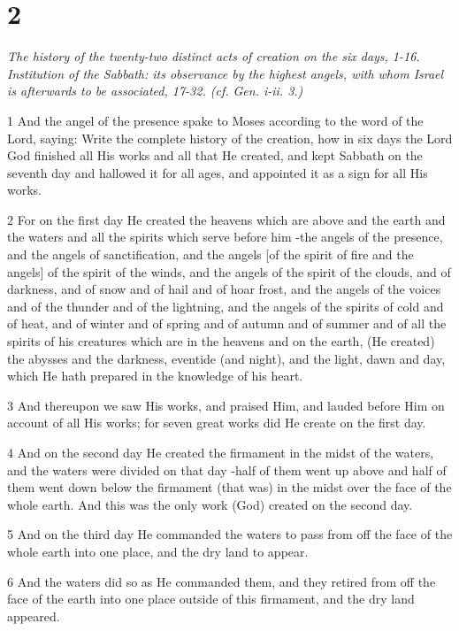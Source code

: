 \chapter{2}

\par \textit{The history of the twenty-two distinct acts of creation on the six days, 1-16. Institution of the Sabbath: its observance by the highest angels, with whom Israel is afterwards to be associated, 17-32. (cf. Gen. i-ii. 3.)}

\par 1 And the angel of the presence spake to Moses according to the word of the Lord, saying: Write the complete history of the creation, how in six days the Lord God finished all His works and all that He created, and kept Sabbath on the seventh day and hallowed it for all ages, and appointed it as a sign for all His works.
\par 2 For on the first day He created the heavens which are above and the earth and the waters and all the spirits which serve before him -the angels of the presence, and the angels of sanctification, and the angels [of the spirit of fire and the angels] of the spirit of the winds, and the angels of the spirit of the clouds, and of darkness, and of snow and of hail and of hoar frost, and the angels of the voices and of the thunder and of the lightning, and the angels of the spirits of cold and of heat, and of winter and of spring and of autumn and of summer and of all the spirits of his creatures which are in the heavens and on the earth, (He created) the abysses and the darkness, eventide (and night), and the light, dawn and day, which He hath prepared in the knowledge of his heart.
\par 3 And thereupon we saw His works, and praised Him, and lauded before Him on account of all His works; for seven great works did He create on the first day.
\par 4 And on the second day He created the firmament in the midst of the waters, and the waters were divided on that day -half of them went up above and half of them went down below the firmament (that was) in the midst over the face of the whole earth. And this was the only work (God) created on the second day.
\par 5 And on the third day He commanded the waters to pass from off the face of the whole earth into one place, and the dry land to appear.
\par 6 And the waters did so as He commanded them, and they retired from off the face of the earth into one place outside of this firmament, and the dry land appeared.

